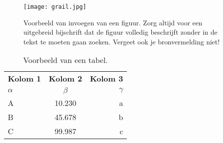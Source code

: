 \begin{figure}
  \centering
  \texttt{[image: grail.jpg]}
  \caption[Voorbeeld figuur.]{\label{fig:grail}Voorbeeld van invoegen van een figuur. Zorg altijd voor een uitgebreid bijschrift dat de figuur volledig beschrijft zonder in de tekst te moeten gaan zoeken. Vergeet ook je bronvermelding niet!}
\end{figure}

%

\lipsum[7-20]

\begin{table}
  \centering
  \begin{tabular}{lcr}
    \toprule
    \textbf{Kolom 1} & \textbf{Kolom 2} & \textbf{Kolom 3} \\
    $\alpha$         & $\beta$          & $\gamma$         \\
    \midrule
    A                & 10.230           & a                \\
    B                & 45.678           & b                \\
    C                & 99.987           & c                \\
    \bottomrule
  \end{tabular}
  \caption[Voorbeeld tabel]{\label{tab:example}Voorbeeld van een tabel.}
\end{table}


